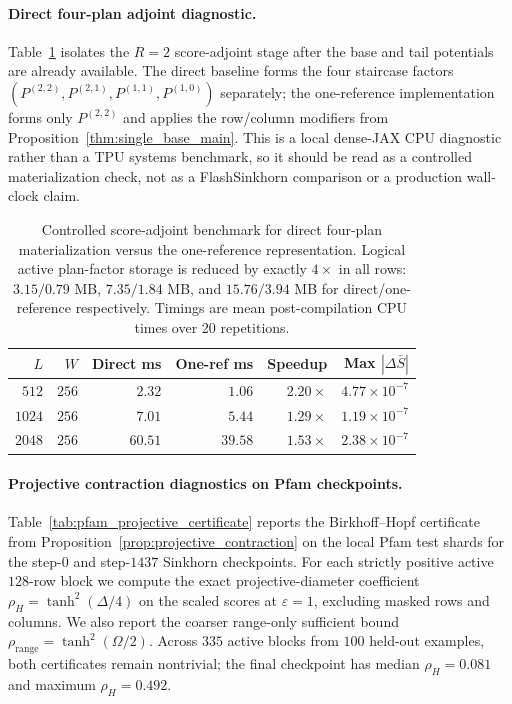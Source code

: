 \documentclass{article}
\begin{document}
\paragraph{Direct four-plan adjoint diagnostic.}
Table~\ref{tab:four_plan_benchmark} isolates the $R=2$ score-adjoint stage after the base and tail potentials are already available. The direct baseline forms the four staircase factors $(P^{(2,2)},P^{(2,1)},P^{(1,1)},P^{(1,0)})$ separately; the one-reference implementation forms only $P^{(2,2)}$ and applies the row/column modifiers from Proposition~\ref{thm:single_base_main}. This is a local dense-JAX CPU diagnostic rather than a TPU systems benchmark, so it should be read as a controlled materialization check, not as a FlashSinkhorn comparison or a production wall-clock claim.

\begin{table}[h]
    \centering
    \begin{tabular}{@{}rrrrrr@{}}
        \toprule
        $L$ & $W$ & Direct ms & One-ref ms & Speedup & Max $|\Delta\bar S|$ \\
        \midrule
        $512$ & $256$ & $2.32$ & $1.06$ & $2.20\times$ & $4.77\times 10^{-7}$ \\
        $1024$ & $256$ & $7.01$ & $5.44$ & $1.29\times$ & $1.19\times 10^{-7}$ \\
        $2048$ & $256$ & $60.51$ & $39.58$ & $1.53\times$ & $2.38\times 10^{-7}$ \\
        \bottomrule
    \end{tabular}
    \caption{Controlled score-adjoint benchmark for direct four-plan materialization versus the one-reference representation. Logical active plan-factor storage is reduced by exactly $4\times$ in all rows: $3.15/0.79$ MB, $7.35/1.84$ MB, and $15.76/3.94$ MB for direct/one-reference respectively. Timings are mean post-compilation CPU times over 20 repetitions.}
    \label{tab:four_plan_benchmark}
\end{table}

\paragraph{Projective contraction diagnostics on Pfam checkpoints.}
Table~\ref{tab:pfam_projective_certificate} reports the Birkhoff--Hopf certificate from Proposition~\ref{prop:projective_contraction} on the local Pfam test shards for the step-$0$ and step-$1437$ Sinkhorn checkpoints. For each strictly positive active $128$-row block we compute the exact projective-diameter coefficient $\rho_H=\tanh^2(\Delta/4)$ on the scaled scores at $\varepsilon=1$, excluding masked rows and columns. We also report the coarser range-only sufficient bound $\rho_{\mathrm{range}}=\tanh^2(\Omega/2)$. Across $335$ active blocks from $100$ held-out examples, both certificates remain nontrivial; the final checkpoint has median $\rho_H=0.081$ and maximum $\rho_H=0.492$.
\end{document}
